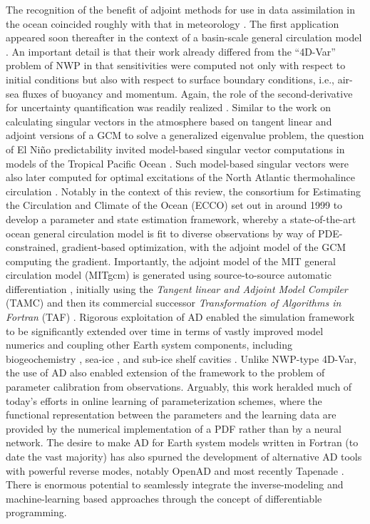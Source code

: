 The recognition of the benefit of adjoint methods for use in data assimilation in the ocean coincided roughly with that in meteorology \cite{Thacker:1988kp,Thacker:1988ed}. 
The first application appeared soon thereafter in the context of a basin-scale general circulation model \cite{Tziperman.1989,Tziperman:1992hg,Tziperman:1992jw}. 
An important detail is that their work already differed from the ``4D-Var'' problem of NWP in that sensitivities were computed not only with respect to initial conditions but also with respect to surface boundary conditions, i.e., air-sea fluxes of buoyancy and momentum.
Again, the role of the second-derivative for uncertainty quantification was readily realized \cite{Thacker:1989jf}.
Similar to the work on calculating singular vectors in the atmosphere based on tangent linear and adjoint versions of a GCM to solve a generalized eigenvalue problem, the question of El Ni\~no predictability invited model-based singular vector computations in models of the Tropical Pacific Ocean \cite{Moore:1997ci,Moore:1997fp}.
Such model-based singular vectors were also later computed for optimal excitations of the North Atlantic thermohalince circulation \cite{Zanna.2010,Zanna:2011ge,Zanna:2012dw}.
Notably in the context of this review, the consortium for Estimating the Circulation and Climate of the Ocean (ECCO) \cite{Stammer.2002} set out in around 1999 to develop a parameter and state estimation framework, whereby a state-of-the-art ocean general circulation model is fit to diverse observations by way of PDE-constrained, gradient-based optimization, with the adjoint model of the GCM computing the gradient.
Importantly, the adjoint model of the MIT general circulation model (MITgcm) is generated using source-to-source automatic differentiation \cite{Marotzke:1999wc,Heimbach.2005}, initially using the \textit{Tangent linear and Adjoint Model Compiler} (TAMC)\cite{Giering:1998in} and then its commercial successor \textit{Transformation of Algorithms in Fortran} (TAF) \cite{Giering.2006}.
Rigorous exploitation of AD enabled the simulation framework to be significantly extended over time in terms of vastly improved model numerics \cite{Forget.2015m9i} and coupling other Earth system components, including biogeochemistry \cite{Dutkiewicz:2006gw}, sea-ice \cite{Heimbach:2010fz}, and sub-ice shelf cavities \cite{Heimbach:2012iu}.
Unlike NWP-type 4D-Var, the use of AD also enabled extension of the framework to the problem of parameter calibration from observations\cite{Ferreira.2005,Stammer:2005dw,Liu:2012jd}. 
Arguably, this work heralded much of today's efforts in online learning of parameterization schemes, where the functional representation between the parameters and the learning data are provided by the numerical implementation of a PDF rather than by a neural network.
The desire to make AD for Earth system models written in Fortran (to date the vast majority) has also spurned the development of alternative AD tools with powerful reverse modes, notably OpenAD \cite{Utke:2008ko} and most recently Tapenade \cite{Hascoet.2013,Gaikwad.2023,Gaikwad.2024}.
There is enormous potential to seamlessly integrate the inverse-modeling and machine-learning based approaches through the concept of differentiable programming.

